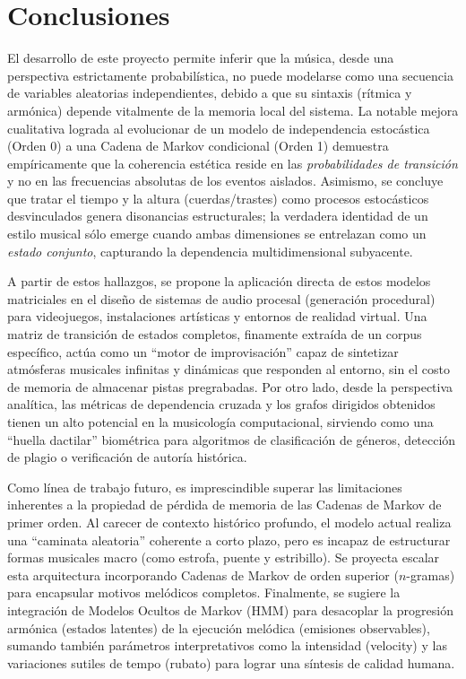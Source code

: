 \documentclass{article}
\theoremstyle{plain}
\theoremstyle{definition}
\begin{document}
\section*{Conclusiones}

El desarrollo de este proyecto permite inferir que la música, desde una perspectiva estrictamente probabilística, no puede modelarse como una secuencia de variables aleatorias independientes, debido a que su sintaxis (rítmica y armónica) depende vitalmente de la memoria local del sistema. La notable mejora cualitativa lograda al evolucionar de un modelo de independencia estocástica (Orden 0) a una Cadena de Markov condicional (Orden 1) demuestra empíricamente que la coherencia estética reside en las \textit{probabilidades de transición} y no en las frecuencias absolutas de los eventos aislados. Asimismo, se concluye que tratar el tiempo y la altura (cuerdas/trastes) como procesos estocásticos desvinculados genera disonancias estructurales; la verdadera identidad de un estilo musical sólo emerge cuando ambas dimensiones se entrelazan como un \textit{estado conjunto}, capturando la dependencia multidimensional subyacente.

A partir de estos hallazgos, se propone la aplicación directa de estos modelos matriciales en el diseño de sistemas de audio procesal (generación procedural) para videojuegos, instalaciones artísticas y entornos de realidad virtual. Una matriz de transición de estados completos, finamente extraída de un corpus específico, actúa como un ``motor de improvisación'' capaz de sintetizar atmósferas musicales infinitas y dinámicas que responden al entorno, sin el costo de memoria de almacenar pistas pregrabadas. Por otro lado, desde la perspectiva analítica, las métricas de dependencia cruzada y los grafos dirigidos obtenidos tienen un alto potencial en la musicología computacional, sirviendo como una ``huella dactilar'' biométrica para algoritmos de clasificación de géneros, detección de plagio o verificación de autoría histórica.

Como línea de trabajo futuro, es imprescindible superar las limitaciones inherentes a la propiedad de pérdida de memoria de las Cadenas de Markov de primer orden. Al carecer de contexto histórico profundo, el modelo actual realiza una ``caminata aleatoria'' coherente a corto plazo, pero es incapaz de estructurar formas musicales macro (como estrofa, puente y estribillo). Se proyecta escalar esta arquitectura incorporando Cadenas de Markov de orden superior ($n$-gramas) para encapsular motivos melódicos completos. Finalmente, se sugiere la integración de Modelos Ocultos de Markov (HMM) para desacoplar la progresión armónica (estados latentes) de la ejecución melódica (emisiones observables), sumando también parámetros interpretativos como la intensidad (velocity) y las variaciones sutiles de tempo (rubato) para lograr una síntesis de calidad humana.
\end{document}

